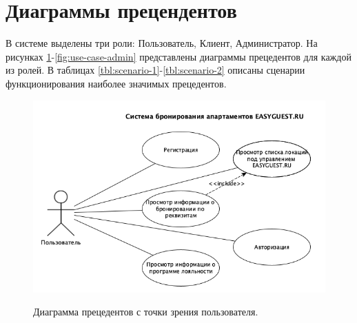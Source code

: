 \section*{Диаграммы прецендентов}
В системе выделены три роли: Пользователь, Клиент, Администратор. На рисунках \ref{fig:use-case-user}-\ref{fig:use-case-admin} представлены диаграммы прецедентов для каждой из ролей. В таблицах \ref{tbl:scenario-1}-\ref{tbl:scenario-2} описаны сценарии функционирования наиболее значимых прецедентов.  

\begin{figure}[h]
	\begin{center}
		{\includegraphics[scale = 0.6]{img/use-case/user.png}}
		\caption{Диаграмма прецедентов с точки зрения пользователя.}
		\label{fig:use-case-user}
	\end{center}
\end{figure}

\pagebreak

